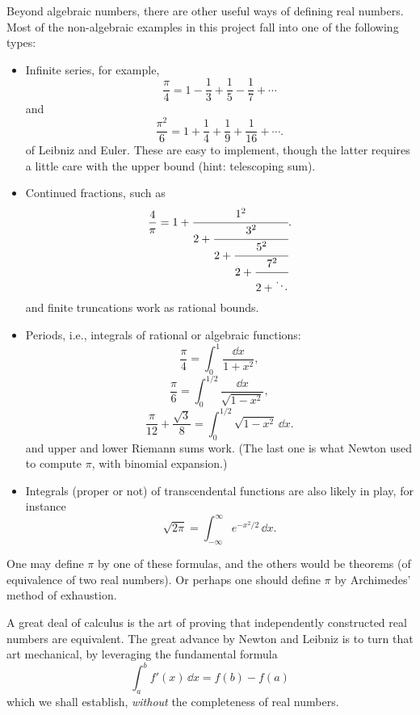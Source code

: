 \begin{remark}\label{rem:sources-of-raw-reals}
Beyond algebraic numbers, there are other useful ways of defining real
numbers.  Most of the non-algebraic examples in this project fall into one of
the following types:
\begin{itemize}
  \item Infinite series, for example,
  \[
    \frac{\pi}{4}
    =
    1-\frac{1}{3}+\frac{1}{5}-\frac{1}{7}+\cdots
  \]
  and
  \[
    \frac{\pi^2}{6}
    =
    1+\frac{1}{4}+\frac{1}{9}+\frac{1}{16}+\cdots .
  \]
  of Leibniz and Euler. These are easy to implement, though the latter requires a little
  care with the upper bound (hint: telescoping sum).

  \item Continued fractions, such as
  \[
    \frac{4}{\pi}
    =
    1+\cfrac{1^2}{2+\cfrac{3^2}{2+\cfrac{5^2}{2+\cfrac{7^2}{2+\ddots}}}}.
  \]
  and finite truncations work as rational bounds.

  \item Periods, i.e., integrals of rational or algebraic functions:
  \[
    \frac{\pi}{4}
    =
    \int_0^1\frac{\dd x}{1+x^2},
  \]
  \[
    \frac{\pi}{6}
    =
    \int_0^{1/2}\frac{\dd x}{\sqrt{1-x^2}},
  \]
  \[
    \frac{\pi}{12}+\frac{\sqrt3}{8}
    =
    \int_0^{1/2}\sqrt{1-x^2}\,\dd x.
  \]
  and upper and lower Riemann sums work. (The last one is what Newton used to compute \(\pi\),
  with binomial expansion.)

  \item Integrals (proper or not) of transcendental functions are also
  likely in play, for instance
  \[
    \sqrt{2\pi}
    =
    \int_{-\infty}^{\infty} e^{-x^2/2}\,\dd x.
  \]
\end{itemize}

One may define \(\pi\) by one of these formulas, and the others would be
theorems (of equivalence of two real numbers). Or perhaps one should
define \(\pi\) by Archimedes' method of exhaustion.
\end{remark}

\begin{remark}\label{rem:calculus-as-equivalence}
A great deal of calculus is the art of proving that independently constructed
real numbers are equivalent. The great advance by Newton and Leibniz is
to turn that art mechanical, by leveraging the fundamental formula
\[
  \int_a^b f'(x)\,\dd x = f(b)-f(a)
\]
which we shall establish, \emph{without} the completeness of real numbers.
\end{remark}

